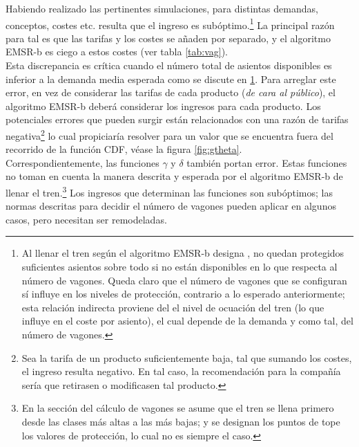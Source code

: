 \documentclass[12pt]{article}
\begin{document}
Habiendo realizado las pertinentes simulaciones, para distintas demandas, conceptos, costes etc. resulta que el ingreso es subóptimo.\footnote{Al llenar el tren según el algoritmo EMSR-b designa \cite{wiki:emsr}, no quedan protegidos suficientes asientos sobre todo si no están disponibles en lo que respecta al número de vagones. Queda claro que el número de vagones que se configuran sí influye en los niveles de protección, contrario a lo esperado anteriormente; esta relación indirecta proviene del el nivel de ocuación del tren (lo que influye en el coste por asiento), el cual depende de la demanda y como tal, del número de vagones.\label{fot:np}} La principal razón para tal es que las tarifas y los costes se añaden por separado, y el algoritmo EMSR-b es ciego a estos costes (ver tabla \ref{tab:vag}).\\

Esta discrepancia es crítica cuando el número total de asientos disponibles es inferior a la demanda media esperada como se discute en \ref{fot:np}. Para arreglar este error, en vez de considerar las tarifas de cada producto (\emph{de cara al público}), el algoritmo EMSR-b deberá considerar los ingresos para cada producto. Los potenciales errores que pueden surgir están relacionados con una razón de tarifas negativa\footnote{Sea la tarifa de un producto suficientemente baja, tal que sumando los costes, el ingreso resulta negativo. En tal caso, la recomendación para la compañía sería que retirasen o modificasen tal producto.} lo cual propiciaría resolver para un valor que se encuentra fuera del recorrido de la función CDF, véase la figura \ref{fig:gtheta}.\\

Correspondientemente, las funciones $\gamma$ y $\delta$ también portan error. Estas funciones no toman en cuenta la manera descrita y esperada por el algoritmo EMSR-b de llenar el tren.\footnote{En la sección del cálculo de vagones se asume que el tren se llena primero desde las clases más altas a las más bajas; y se designan los puntos de tope los valores de protección, lo cual no es siempre el caso.} Los ingresos que determinan las funciones son subóptimos; las normas descritas para decidir el número de vagones pueden aplicar en algunos casos, pero necesitan ser remodeladas.
\end{document}
